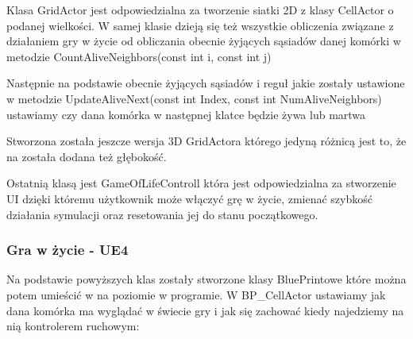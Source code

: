 \documentclass[a4paper,12pt,reqno]{article}
\begin{document}


Klasa GridActor jest odpowiedzialna za tworzenie siatki 2D z klasy CellActor o podanej wielkości. W samej klasie dzieją się też wszystkie obliczenia związane z działaniem gry w życie od obliczania obecnie żyjących sąsiadów danej komórki w metodzie CountAliveNeighbors(const int i, const int j)



Następnie na podstawie obecnie żyjących sąsiadów i reguł jakie zostały ustawione w metodzie UpdateAliveNext(const int Index, const int NumAliveNeighbors) ustawiamy czy dana komórka w następnej klatce będzie żywa lub martwa




Stworzona została jeszcze wersja 3D GridActora którego jedyną różnicą jest to, że na została dodana też głębokość.

Ostatnią klasą jest GameOfLifeControll która jest odpowiedzialna
za stworzenie UI dzięki któremu użytkownik może włączyć grę w życie, zmienać szybkość działania symulacji oraz resetowania jej do stanu początkowego.

\subsubsection{Gra w życie - UE4}

Na podstawie powyższych klas zostały stworzone klasy BluePrintowe które można potem umieścić w na poziomie w programie. W BP\_CellActor ustawiamy jak dana komórka ma wyglądać w świecie gry i jak się zachować kiedy najedziemy na nią kontrolerem ruchowym:
\end{document}
